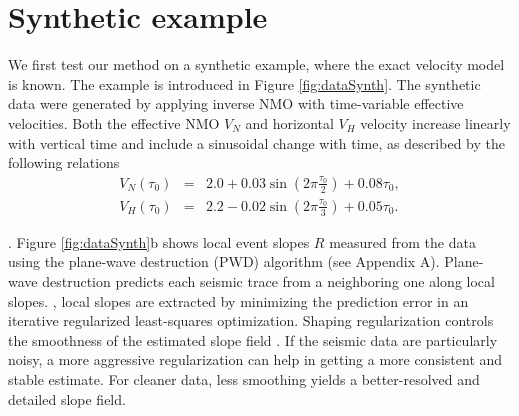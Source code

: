\section{Synthetic example }

\renewcommand{\figdir}{Fig}


We first test our method on a synthetic example, where the exact
velocity model is known.  The example is introduced in Figure
\ref{fig:dataSynth}. The synthetic data were generated by applying
inverse \taup NMO with time-variable effective velocities. Both the
effective NMO $V_{N}$ and horizontal $V_{H}$ velocity increase
linearly with vertical time and include a sinusoidal change with time,
as described by the following relations
\begin{eqnarray*}
V_{N}^{\text{ \ }}\left( \tau _{0}\right) &=&2.0+0.03\sin (2\pi \frac{\tau
_{0}}{2})+0.08\tau _{0}, \\
V_{H}^{\text{ \ }}\left( \tau _{0}\right) &=&2.2-0.02\sin (2\pi \frac{\tau
_{0}}{3})+0.05\tau _{0}.
\end{eqnarray*}

\citep{ilyabook2006}.  Figure \ref{fig:dataSynth}b shows local event
slopes $R$ measured from the data using the plane-wave destruction
(PWD) algorithm (see Appendix A). Plane-wave destruction predicts each
seismic trace from a neighboring one along local slopes. , local slopes are extracted by minimizing the
prediction error in an iterative regularized least-squares
optimization. Shaping regularization controls the smoothness of the
estimated slope field \citep{FomelShaping}. If the seismic data are
particularly noisy, a more aggressive regularization can help in
getting a more consistent and stable estimate. For cleaner data, less
smoothing yields a better-resolved and detailed slope field.

